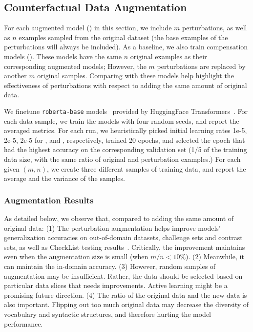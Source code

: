 \subsection{Counterfactual Data Augmentation}

For each augmented model (\maug) in this section, we include $m$ perturbations, as well as $n$ examples sampled from the original dataset (the base examples of the perturbations will always be included).
As a baseline, we also train compensation models (\mcomp).
These models have the same $n$ original examples as their corresponding augmented models; However, the $m$ perturbations are replaced by another $m$ original samples.
Comparing with these models help highlight the effectiveness of perturbations with respect to adding the same amount of original data. 

We finetune \texttt{roberta-base} models~\cite{liu2019roberta} provided by HuggingFace Transformers~\cite{Wolf2019HuggingFacesTS}.
For each data sample, we train the models with four random seeds, and report the averaged metrics. 
For each run, we heuristically picked initial learning rates 1e-5, 2e-5, 2e-5 for \sst, \nli and \qqp, respectively, trained 20 epochs, and selected the epoch that had the highest accuracy on the corresponding validation set (1/5 of the training data size, with the same ratio of original and perturbation examples.)
For each given $(m,n)$, we create three different samples of training data, and report the average and the variance of the samples. 


\subsubsection{Augmentation Results}
As detailed below, we observe that, compared to adding the same amount of original data: 
(1) The perturbation augmentation helps improve models' generalization accuracies on out-of-domain datasets, challenge sets and contrast sets, as well as CheckList testing results~\cite{checklist:acl20}.
Critically, the improvement maintains even when the augmentation size is small (\eg when $m/n<10\%$).
(2) Meanwhile, it can maintain the in-domain accuracy.
(3) However, random samples of augmentation may be insufficient. Rather, the data should be selected based on particular data slices that needs improvements. 
Active learning might be a promising future direction.
(4) The ratio of the original data and the new data is also important. Flipping out too much original data may decrease the diversity of vocabulary and syntactic structures, and therefore hurting the model performance.

